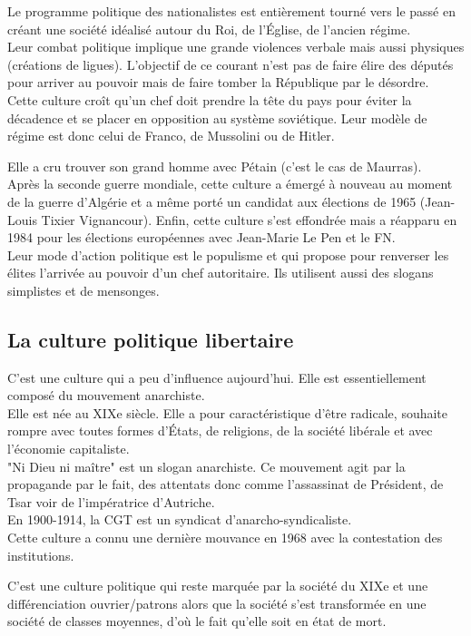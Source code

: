 \documentclass[12pt, a4paper, openany]{book}
\begin{document}
Le programme politique des nationalistes est entièrement tourné vers le passé en créant une société idéalisé autour du Roi, de l'Église, de l'ancien régime. \\
Leur combat politique implique une grande violences verbale mais aussi physiques (créations de ligues). L'objectif de ce courant n'est pas de faire élire des députés pour arriver au pouvoir mais de faire tomber la République par le désordre. \\
Cette culture croît qu'un chef doit prendre la tête du pays pour éviter la décadence et se placer en opposition au système soviétique. Leur modèle de régime est donc celui de Franco, de Mussolini ou de Hitler.


Elle a cru trouver son grand homme avec Pétain (c'est le cas de Maurras). \\
Après la seconde guerre mondiale, cette culture a émergé à nouveau au moment de la guerre d'Algérie et a même porté un candidat aux élections de 1965 (Jean-Louis Tixier Vignancour). Enfin, cette culture s'est effondrée mais a réapparu en 1984 pour les élections européennes avec Jean-Marie Le Pen et le FN. \\
Leur mode d'action politique est le populisme et qui propose pour renverser les élites l'arrivée au pouvoir d'un chef autoritaire. Ils utilisent aussi des slogans simplistes et de mensonges. 


\subsection{La culture politique libertaire}

C'est une culture qui a peu d'influence aujourd'hui. Elle est essentiellement composé du mouvement anarchiste. \\
Elle est née au XIXe siècle. Elle a pour caractéristique d'être radicale, souhaite rompre avec toutes formes d'États, de religions, de la société libérale et avec l'économie capitaliste. \\
"Ni Dieu ni maître" est un slogan anarchiste. Ce mouvement agit par la propagande par le fait, des attentats donc comme l'assassinat de Président, de Tsar voir de l'impératrice d'Autriche. \\
En 1900-1914, la CGT est un syndicat d'anarcho-syndicaliste. \\
Cette culture a connu une dernière mouvance en 1968 avec la contestation des institutions. 


C'est une culture politique qui reste marquée par la société du XIXe et une différenciation ouvrier/patrons alors que la société s'est transformée en une société de classes moyennes, d'où le fait qu'elle soit en état de mort.
\end{document}
